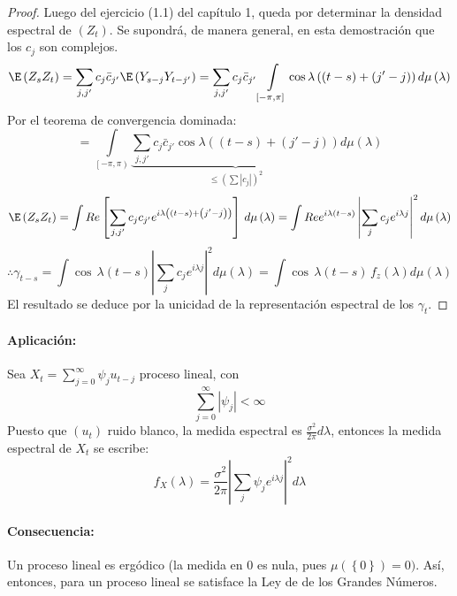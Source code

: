 \begin{proof}
Luego del ejercicio (1.1) del cap\'{i}tulo 1, queda por determinar la densidad espectral de $(Z_{{t}})$. Se supondr\'{a}, de manera general, en esta demostraci\'{o}n que los $c_{j}$ son complejos.
\[
\E\left( {Z_{s} Z_{t} } \right)=\sum_{j,j'} {c_{j} \bar{{c}}_{j'} \E\left( {Y_{s-j} Y_{t-j'} } \right)} =\sum_{j,j'} {c_{j} \bar{{c}}_{j'} } \int\limits_{\left[ {-\pi ,\pi } \right]} {\cos \lambda \left( {\left( {t-s} \right)+\left( {j'-j} \right)} \right)d\mu \left( \lambda \right)} 
\]
Por el teorema de convergencia dominada: 
\[
=\int\limits_{\left[ {-\pi ,\pi } \right)} {\underbrace {\sum_{j,j'} {c_{j} \bar{{c}}_{j'} \cos \lambda \left( {\left( {t-s} \right)+\left( {j'-j} \right)} \right)} }_{\le \left( {\sum {\left| {c_{j} } \right|} } \right)^{2}}} d\mu \left( \lambda \right)
\]
\[
\E\left( {Z_{s} Z_{t} } \right)=\int {Re\left[ {\sum_{j,j'} {c_{j} c_{j'} e^{i\lambda \left( {\left( {t-s} \right)+\left( {j'-j} \right)} \right)}} } \right]\,d\mu \left( \lambda \right)} =\int {Re e^{i\lambda \left( {t-s} \right)}\left| {\sum_j {c_{j} e^{i\lambda j}} } \right|^{2}d\mu \left( \lambda \right)} 
\]
\[
\therefore\gamma_{t-s} =\int {\cos \,\lambda \left( {t-s} \right)} \left| {\sum_j {c_{j} e^{i\lambda j}} } \right|^{2}d\mu \left( \lambda \right)=\int {\cos \,\lambda (t-s)\,f_{z} (\lambda )d\mu (\lambda )} 
\]
El resultado se deduce por la unicidad de la representaci\'{o}n espectral de los $\gamma_{t}$.
\end{proof}

\paragraph{Aplicaci\'{o}n: } Sea $X_{t} =\sum_{j=0}^\infty {\psi_{j } u_{t-j} } $ proceso lineal, con 
\[
\sum_{j=0}^\infty \left| \psi_{j} \right| <\infty 
\]
Puesto que $(u_{t})$ ruido blanco, la medida espectral es $\frac{\sigma^{2}}{2\pi }d\lambda$, entonces la medida espectral de $X_{t}$ se escribe:
\[
f_{X} \left( \lambda \right)=\frac{\sigma^{2}}{2\pi }\left| {\displaystyle\sum_j {\psi_{j} e^{i\lambda j}} } \right|^{2}d\lambda 
\]

\paragraph{Consecuencia: } Un proceso lineal es erg\'{o}dico (la medida en 0 es nula, pues $\mu \left( \left\{ 0 \right\} \right)=0)$. As\'{i}, entonces, para un proceso lineal se satisface la Ley de de los Grandes N\'{u}meros.

